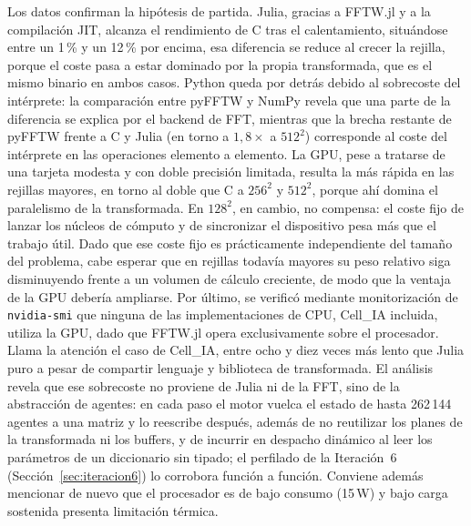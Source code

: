 \documentclass[runningheads]{llncs}
\begin{document}
Los datos confirman la hipótesis de partida. Julia, gracias a FFTW.jl y a la compilación JIT, alcanza el rendimiento de C tras el calentamiento, situándose entre un 1\,\% y un 12\,\% por encima, esa diferencia se reduce al crecer la rejilla, porque el coste pasa a estar dominado por la propia transformada, que es el mismo binario en ambos casos. Python queda por detrás debido al sobrecoste del intérprete: la comparación entre pyFFTW y NumPy revela que una parte de la diferencia se explica por el backend de FFT, mientras que la brecha restante de pyFFTW frente a C y Julia (en torno a $1{,}8\times$ a $512^2$) corresponde al coste del intérprete en las operaciones elemento a elemento. La GPU, pese a tratarse de una tarjeta modesta y con doble precisión limitada, resulta la más rápida en las rejillas mayores, en torno al doble que C a $256^2$ y $512^2$, porque ahí domina el paralelismo de la transformada. En $128^2$, en cambio, no compensa: el coste fijo de lanzar los núcleos de cómputo y de sincronizar el dispositivo pesa más que el trabajo útil. Dado que ese coste fijo es prácticamente independiente del tamaño del problema, cabe esperar que en rejillas todavía mayores su peso relativo siga disminuyendo frente a un volumen de cálculo creciente, de modo que la ventaja de la GPU debería ampliarse. Por último, se verificó mediante monitorización de \texttt{nvidia-smi} que ninguna de las implementaciones de CPU, Cell\_IA incluida, utiliza la GPU, dado que FFTW.jl opera exclusivamente sobre el procesador.\\


Llama la atención el caso de Cell\_IA, entre ocho y diez veces más lento que Julia puro a pesar de compartir lenguaje y biblioteca de transformada. El análisis revela que ese sobrecoste no proviene de Julia ni de la FFT, sino de la abstracción de agentes: en cada paso el motor vuelca el estado de hasta 262\,144 agentes a una matriz y lo reescribe después, además de no reutilizar los planes de la transformada ni los buffers, y de incurrir en despacho dinámico al leer los parámetros de un diccionario sin tipado; el perfilado de la Iteración~6 (Sección~\ref{sec:iteracion6}) lo corrobora función a función. Conviene además mencionar de nuevo que el procesador es de bajo consumo (15\,W) y bajo carga sostenida presenta limitación térmica.
\end{document}
